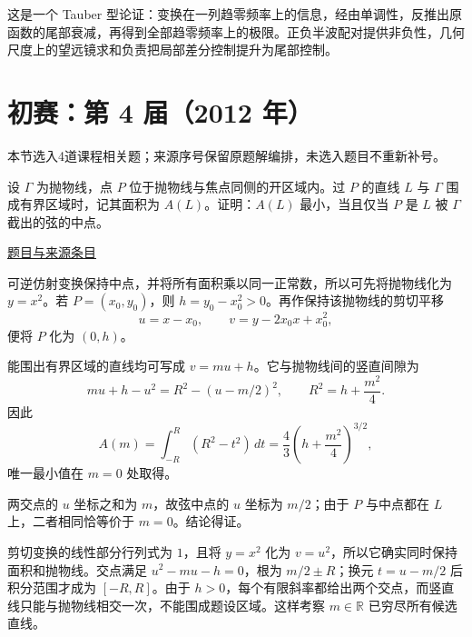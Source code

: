 \documentclass[12pt,fontset=fandol]{ctexart}
\begin{document}
\begin{remark}[方法与条件]这是一个 Tauber 型论证：变换在一列趋零频率上的信息，经由单调性，反推出原函数的尾部衰减，再得到全部趋零频率上的极限。正负半波配对提供非负性，几何尺度上的望远镜求和负责把局部差分控制提升为尾部控制。\end{remark}

\section{初赛：第 4 届（2012 年）}

本节选入4道课程相关题；来源序号保留原题解编排，未选入题目不重新补号。

\begin{example}[来源序号2]\label{ex:pre04-math:2}\label{pr:pre04-math:2}

设 $\Gamma$ 为抛物线，点 $P$ 位于抛物线与焦点同侧的开区域内。过 $P$ 的直线 $L$ 与 $\Gamma$ 围成有界区域时，记其面积为 $A(L)$。证明：$A(L)$ 最小，当且仅当 $P$ 是 $L$ 被 $\Gamma$ 截出的弦的中点。

\par\href{https://github.com/lzxcr/cmc-mathematics/blob/64916fa1fdbc3e444a652eca204d5669058ee321/src/problems/preliminary/04/02.md}{题目与来源条目}

\end{example}

\begin{solve}\label{ans:pre04-math:2}

可逆仿射变换保持中点，并将所有面积乘以同一正常数，所以可先将抛物线化为 $y=x^2$。若 $P=(x_0,y_0)$，则 $h=y_0-x_0^2>0$。再作保持该抛物线的剪切平移
\[
u=x-x_0,\qquad v=y-2x_0x+x_0^2,
\]
便将 $P$ 化为 $(0,h)$。

能围出有界区域的直线均可写成 $v=mu+h$。它与抛物线间的竖直间隙为
\[
mu+h-u^2=R^2-(u-m/2)^2,
\qquad R^2=h+\frac{m^2}{4}.
\]
因此
\[
A(m)=\int_{-R}^{R}(R^2-t^2)\,dt
=\frac43\left(h+\frac{m^2}{4}\right)^{3/2},
\]
唯一最小值在 $m=0$ 处取得。

两交点的 $u$ 坐标之和为 $m$，故弦中点的 $u$ 坐标为 $m/2$；由于 $P$ 与中点都在 $L$ 上，二者相同恰等价于 $m=0$。结论得证。

剪切变换的线性部分行列式为 $1$，且将 $y=x^2$ 化为 $v=u^2$，所以它确实同时保持面积和抛物线。交点满足 $u^2-mu-h=0$，根为 $m/2\pm R$；换元 $t=u-m/2$ 后积分范围才成为 $[-R,R]$。由于 $h>0$，每个有限斜率都给出两个交点，而竖直线只能与抛物线相交一次，不能围成题设区域。这样考察 $m\in\mathbb R$ 已穷尽所有候选直线。

\end{solve}
\end{document}
